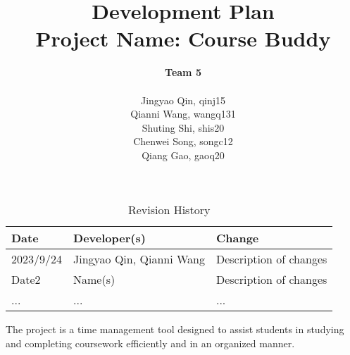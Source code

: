 \documentclass{article}
\title{\textbf{Development Plan}\\\textbf{Project Name: Course Buddy}}
\author{\textbf{Team 5} \\ \\ Jingyao Qin, qinj15\\ Qianni Wang, wangq131\\ Shuting Shi, shis20\\ Chenwei Song, songc12\\  Qiang Gao, gaoq20}
\date{}
\begin{document}
\maketitle

\begin{table}[hp]
\caption{Revision History} \label{TblRevisionHistory}
\begin{tabularx}{\textwidth}{llX}
\toprule
\textbf{Date} & \textbf{Developer(s)} & \textbf{Change}\\
\midrule
2023/9/24 & Jingyao Qin, Qianni Wang  & Description of changes\\
Date2 & Name(s) & Description of changes\\
... & ... & ...\\
\bottomrule
\end{tabularx}
\end{table}

The project is a time management tool designed to assist students in studying and completing coursework efficiently and in an organized manner.
\end{document}

